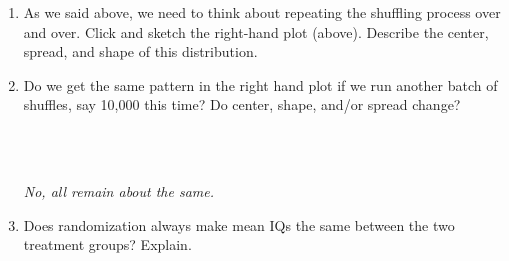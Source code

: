 \begin{enumerate}
 Click  several times.   Record
the difference in means for this shuffle.\\

\item As we said above, we need to think about repeating the shuffling
  process over and over.  Click  and sketch the
  right-hand plot (above).  Describe the center,
  spread, and shape of this distribution.

\item Do we get the same pattern in the right hand plot if we run
  another batch of shuffles, say 10,000 this time?    Do
  center, shape, and/or spread change?
\begin{students}
        \vspace{2cm}\\
\end{students}
\begin{key}
  \\ {\it  No, all remain about the same.}
\end{key}


\item  Does randomization always make mean IQs the same
  between the two treatment groups? Explain. 
\begin{students}
 \vspace{3cm} 
\end{students}


\end{enumerate}
